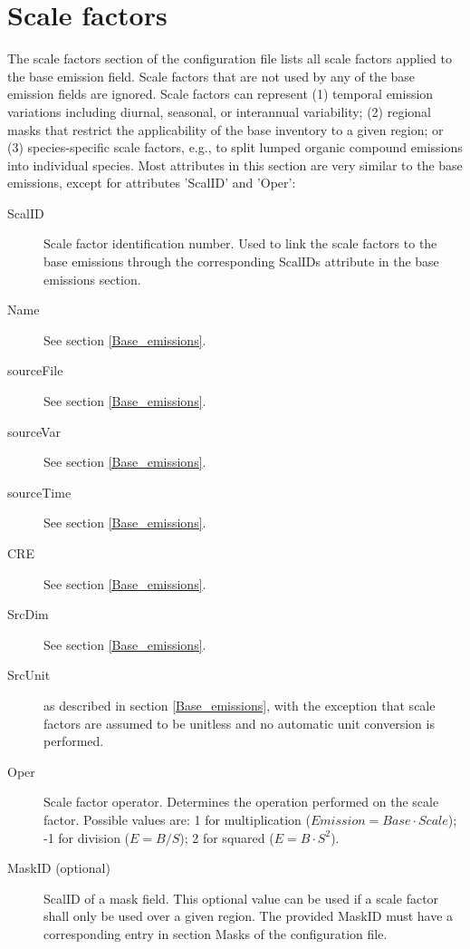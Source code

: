 \documentclass[12pt,a4paper]{article} %
\begin{document}
\section{Scale factors} \label{Scale_factors}
The scale factors section of the configuration file lists all scale factors applied to the base emission field. Scale factors that are not used by any of the base emission fields are ignored. Scale factors can represent (1) temporal emission variations including diurnal, seasonal, or interannual variability; (2) regional masks that restrict the applicability of the base inventory to a given region; or (3) species-specific scale factors, e.g., to split lumped organic compound emissions into individual species. Most attributes in this section are very similar to the base emissions, except for attributes 'ScalID' and 'Oper':

\begin{description}
\item [ScalID] Scale factor identification number. Used to link the scale factors to the base emissions through the corresponding ScalIDs attribute in the base emissions section.
\item [Name] See section \ref{Base_emissions}.
\item [sourceFile] See section \ref{Base_emissions}.
\item [sourceVar] See section \ref{Base_emissions}.
\item [sourceTime] See section \ref{Base_emissions}.
\item [CRE] See section \ref{Base_emissions}.
\item [SrcDim] See section \ref{Base_emissions}.
\item [SrcUnit] as described in section \ref{Base_emissions}, with the exception that scale factors are assumed to be unitless and no automatic unit conversion is performed.
\item [Oper] Scale factor operator. Determines the operation performed on the scale factor. Possible values are: 1 for multiplication ($Emission=Base \cdot Scale$); -1 for division ($E=B / S$); 2 for squared ($E=B \cdot S^2$).
\item [MaskID (optional)] ScalID of a mask field. This optional value can be used if a scale factor shall only be used over a given region. The provided MaskID must have a corresponding entry in section Masks of the configuration file.
\end{description}
\end{document}
